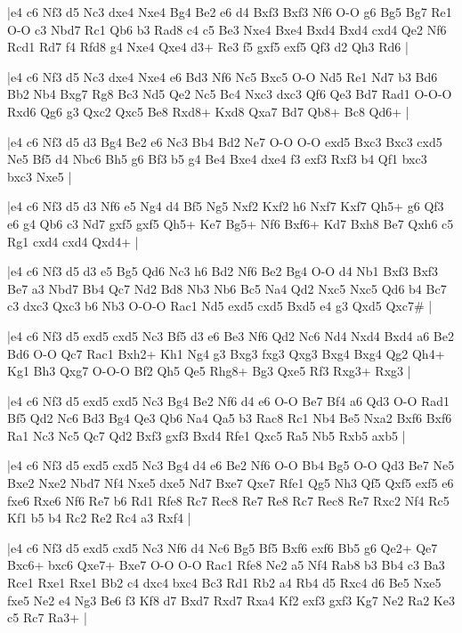 \whitename{}
\blackname{}
\makegametitle
|e4 c6 Nf3 d5 Nc3 dxe4 Nxe4 Bg4 Be2 e6 d4 Bxf3 Bxf3 Nf6 O-O g6 Bg5 Bg7 Re1 O-O c3 Nbd7 Rc1 Qb6 b3 Rad8 c4 c5 Be3 Nxe4 Bxe4 Bxd4 Bxd4 cxd4 Qe2 Nf6 Rcd1 Rd7 f4 Rfd8 g4 Nxe4 Qxe4 d3+ Re3 f5 gxf5 exf5 Qf3 d2 Qh3 Rd6  |

\whitename{}
\blackname{}
\makegametitle
|e4 c6 Nf3 d5 Nc3 dxe4 Nxe4 e6 Bd3 Nf6 Nc5 Bxc5 O-O Nd5 Re1 Nd7 b3 Bd6 Bb2 Nb4 Bxg7 Rg8 Bc3 Nd5 Qe2 Nc5 Bc4 Nxc3 dxc3 Qf6 Qe3 Bd7 Rad1 O-O-O Rxd6 Qg6 g3 Qxc2 Qxc5 Be8 Rxd8+ Kxd8 Qxa7 Bd7 Qb8+ Bc8 Qd6+  |

\whitename{}
\blackname{}
\makegametitle
|e4 c6 Nf3 d5 d3 Bg4 Be2 e6 Nc3 Bb4 Bd2 Ne7 O-O O-O exd5 Bxc3 Bxc3 cxd5 Ne5 Bf5 d4 Nbc6 Bh5 g6 Bf3 b5 g4 Be4 Bxe4 dxe4 f3 exf3 Rxf3 b4 Qf1 bxc3 bxc3 Nxe5  |

\whitename{}
\blackname{}
\makegametitle
|e4 c6 Nf3 d5 d3 Nf6 e5 Ng4 d4 Bf5 Ng5 Nxf2 Kxf2 h6 Nxf7 Kxf7 Qh5+ g6 Qf3 e6 g4 Qb6 c3 Nd7 gxf5 gxf5 Qh5+ Ke7 Bg5+ Nf6 Bxf6+ Kd7 Bxh8 Be7 Qxh6 c5 Rg1 cxd4 cxd4 Qxd4+  |

\whitename{}
\blackname{}
\makegametitle
|e4 c6 Nf3 d5 d3 e5 Bg5 Qd6 Nc3 h6 Bd2 Nf6 Be2 Bg4 O-O d4 Nb1 Bxf3 Bxf3 Be7 a3 Nbd7 Bb4 Qc7 Nd2 Bd8 Nb3 Nb6 Bc5 Na4 Qd2 Nxc5 Nxc5 Qd6 b4 Bc7 c3 dxc3 Qxc3 b6 Nb3 O-O-O Rac1 Nd5 exd5 cxd5 Bxd5 e4 g3 Qxd5 Qxc7\#  |

\whitename{}
\blackname{}
\makegametitle
|e4 c6 Nf3 d5 exd5 cxd5 Nc3 Bf5 d3 e6 Be3 Nf6 Qd2 Nc6 Nd4 Nxd4 Bxd4 a6 Be2 Bd6 O-O Qc7 Rac1 Bxh2+ Kh1 Ng4 g3 Bxg3 fxg3 Qxg3 Bxg4 Bxg4 Qg2 Qh4+ Kg1 Bh3 Qxg7 O-O-O Bf2 Qh5 Qe5 Rhg8+ Bg3 Qxe5 Rf3 Rxg3+ Rxg3  |

\whitename{}
\blackname{}
\makegametitle
|e4 c6 Nf3 d5 exd5 cxd5 Nc3 Bg4 Be2 Nf6 d4 e6 O-O Be7 Bf4 a6 Qd3 O-O Rad1 Bf5 Qd2 Nc6 Bd3 Bg4 Qe3 Qb6 Na4 Qa5 b3 Rac8 Rc1 Nb4 Be5 Nxa2 Bxf6 Bxf6 Ra1 Nc3 Nc5 Qc7 Qd2 Bxf3 gxf3 Bxd4 Rfe1 Qxc5 Ra5 Nb5 Rxb5 axb5  |

\whitename{}
\blackname{}
\makegametitle
|e4 c6 Nf3 d5 exd5 cxd5 Nc3 Bg4 d4 e6 Be2 Nf6 O-O Bb4 Bg5 O-O Qd3 Be7 Ne5 Bxe2 Nxe2 Nbd7 Nf4 Nxe5 dxe5 Nd7 Bxe7 Qxe7 Rfe1 Qg5 Nh3 Qf5 Qxf5 exf5 e6 fxe6 Rxe6 Nf6 Re7 b6 Rd1 Rfe8 Rc7 Rec8 Re7 Re8 Rc7 Rec8 Re7 Rxc2 Nf4 Rc5 Kf1 b5 b4 Rc2 Re2 Rc4 a3 Rxf4  |

\whitename{}
\blackname{}
\makegametitle
|e4 c6 Nf3 d5 exd5 cxd5 Nc3 Nf6 d4 Nc6 Bg5 Bf5 Bxf6 exf6 Bb5 g6 Qe2+ Qe7 Bxc6+ bxc6 Qxe7+ Bxe7 O-O O-O Rac1 Rfe8 Ne2 a5 Nf4 Rab8 b3 Bb4 c3 Ba3 Rce1 Rxe1 Rxe1 Bb2 c4 dxc4 bxc4 Bc3 Rd1 Rb2 a4 Rb4 d5 Rxc4 d6 Be5 Nxe5 fxe5 Ne2 e4 Ng3 Be6 f3 Kf8 d7 Bxd7 Rxd7 Rxa4 Kf2 exf3 gxf3 Kg7 Ne2 Ra2 Ke3 c5 Rc7 Ra3+  |


